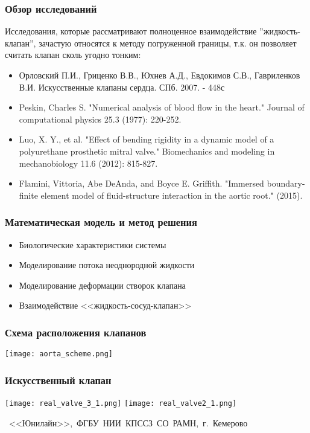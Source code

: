 \documentclass[14pt]{beamer}
\begin{document}
\begin{frame}
\frametitle{Обзор исследований}
    Исследования, которые рассматривают полноценное взаимодействие ''жидкость-клапан'', зачастую относятся
    к методу погруженной границы, т.к. он позволяет считать клапан сколь угодно тонким:
    \par
    {\tiny
        \begin{itemize}
            \item[\MVRightarrow] Орловский П.И., Гриценко В.В., Юхнев А.Д., Евдокимов С.В., Гавриленков В.И. Искусственные клапаны сердца. СПб. 2007. - 448с
            \item[\MVRightarrow] Peskin, Charles S. "Numerical analysis of blood flow in the heart." Journal of computational physics 25.3 (1977): 220-252.
            \item[\MVRightarrow] Luo, X. Y., et al. "Effect of bending rigidity in a dynamic model of a polyurethane prosthetic mitral valve." Biomechanics and modeling in mechanobiology 11.6 (2012): 815-827.
            \item[\MVRightarrow] Flamini, Vittoria, Abe DeAnda, and Boyce E. Griffith. "Immersed boundary-finite element model of fluid-structure interaction in the aortic root." (2015).
        \end{itemize}
    }
\end{frame}

\begin{frame}
\frametitle{Математическая модель и метод решения}
    \begin{itemize}
        \item[\MVRightarrow] Биологические характеристики системы
        \item[\MVRightarrow] Моделирование потока неоднородной жидкости
        \item[\MVRightarrow] Моделирование деформации створок клапана
        \item[\MVRightarrow] Взаимодействие <<жидкость-сосуд-клапан>>
    \end{itemize}
\end{frame}

\begin{frame}
\frametitle{Схема расположения клапанов}
    \begin{center}
        \texttt{[image: aorta\_scheme.png]}
    \end{center}
\end{frame}

\begin{frame}
\frametitle{Искусственный клапан}
    \begin{center}
        \vspace{1.0cm}
        \texttt{[image: real\_valve\_3\_1.png]}
        \texttt{[image: real\_valve2\_1.png]}

        \vspace{1.1cm}
        \mbox{\scriptsize
            <<Юнилайн>>, ФГБУ НИИ КПССЗ СО РАМН, г. Кемерово
        }
    \end{center}
\end{frame}
\end{document}

